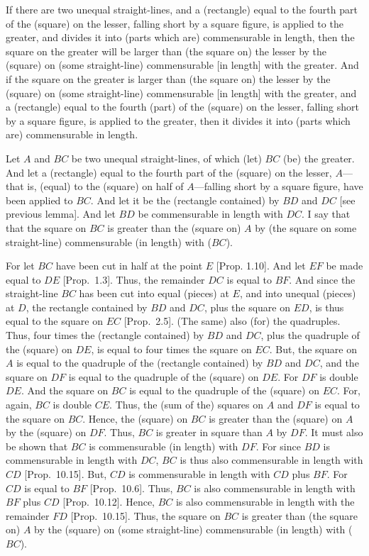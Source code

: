 \begin{Parallel}{}{}
{If there are two unequal straight-lines,
and a (rectangle) equal to the fourth part of the (square) on the
lesser, falling short by a square figure, is applied to the greater, and
divides it into (parts which are) commensurable in length, then
 the  square on the greater  will be  larger than (the  square on) the lesser  by the (square)
on (some straight-line) commensurable [in length] with the greater.
And if the square on the greater is larger than (the square on) the lesser  by the (square)
on (some straight-line) commensurable [in length] with the greater, and
a (rectangle) equal to the fourth (part) of the (square) on the lesser,
falling short by a square figure, is applied to the greater, then it divides it into (parts
which are) commensurable in length.

Let $A$ and $BC$ be two unequal straight-lines, of which (let) $BC$ (be) the
greater. And let a (rectangle) equal to the fourth part of the (square) on the
lesser, $A$---that is, (equal) to the (square) on half of $A$---falling short by a
square figure, have been applied to $BC$. And let it be the (rectangle contained) by $BD$ and $DC$ [see previous lemma]. And let $BD$ be commensurable in length with
$DC$. I say that that the square on $BC$ is greater than the (square on) $A$ by (the square on some straight-line) commensurable (in length) with ($BC$).

\epsfysize=1.1in
\centerline{}

For let $BC$ have been cut in  half at the point $E$ [Prop. 1.10]. And let $EF$ be made equal to
$DE$ [Prop.~1.3]. Thus, the remainder $DC$
is equal to $BF$. And since the straight-line $BC$ has been cut into equal
(pieces) at $E$, and into unequal (pieces) at $D$, the rectangle contained by
$BD$ and $DC$, plus the square on $ED$, is thus equal to the square on $EC$ [Prop.~2.5]. (The same) also (for) the quadruples.  
Thus, four times the (rectangle contained) by $BD$ and $DC$, plus
the quadruple of the (square) on $DE$, is equal to four times the square on 
$EC$. But, the square on $A$ is equal to the quadruple of the (rectangle
contained) by $BD$ and $DC$, and the square on $DF$ is equal to
the quadruple of the (square) on $DE$. For $DF$ is double $DE$. 
And the square on  $BC$ is equal to the quadruple of the (square) on $EC$.
For, again, $BC$ is double $CE$. Thus, the (sum of the) squares on $A$ and
$DF$ is equal to the square on $BC$. Hence, the (square) on $BC$
is greater than the (square) on $A$ by the (square) on $DF$. Thus,
$BC$ is greater in square than $A$ by $DF$. It must also be shown that $BC$
is commensurable (in length) with $DF$. For since $BD$ is commensurable in length
with $DC$, $BC$ is thus also commensurable in length with $CD$ [Prop.~10.15]. 
But, $CD$ is commensurable in length with $CD$ plus $BF$. For $CD$ is equal
to $BF$ [Prop.~10.6].  Thus, $BC$ is also commensurable in length with $BF$ plus $CD$
[Prop.~10.12]. Hence, $BC$ is also commensurable
in length with the remainder $FD$ [Prop.~10.15]. Thus, the square on $BC$ is
greater than (the square on) $A$ by the (square) on (some straight-line)
commensurable (in length) with ($BC$).

}
\end{Parallel}

